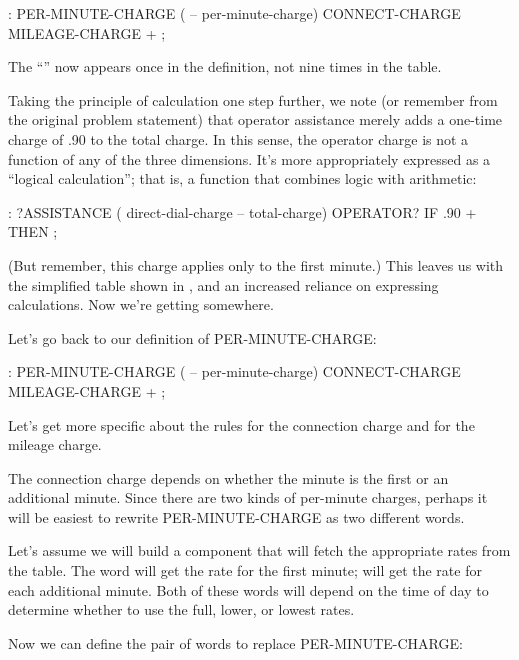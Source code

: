 \begin{Code}
: PER-MINUTE-CHARGE ( -- per-minute-charge)
   CONNECT-CHARGE MILEAGE-CHARGE + ;
\end{Code}

The ``\forth{+}'' now appears once in the definition, not nine times in the table.


\noindent Taking the principle of calculation one step further, we note (or
remember from the original problem statement) that operator assistance
merely adds a one-time charge of .90 to the total charge. In this sense, the
operator charge is not a function of any of the three dimensions. It's more
appropriately expressed as a ``logical calculation''; that is, a function that
combines logic with arithmetic:

\begin{Code}
: ?ASSISTANCE
   ( direct-dial-charge -- total-charge)
   OPERATOR? IF .90 + THEN ;
\end{Code}

(But remember, this charge applies only to the first minute.)
This leaves us with the simplified table shown in , and an
increased reliance on expressing calculations. Now we're getting
somewhere.

Let's go back to our definition of PER-MINUTE-CHARGE:

\begin{Code}
: PER-MINUTE-CHARGE ( -- per-minute-charge)
   CONNECT-CHARGE MILEAGE-CHARGE + ;
\end{Code}

Let's get more specific about the rules for the connection charge and for
the mileage charge.

The connection charge depends on whether the minute is the first or
an additional minute. Since there are two kinds of per-minute charges,
perhaps it will be easiest to rewrite PER-MINUTE-CHARGE as two
different words.

Let's assume we will build a component that will fetch the
appropriate rates from the table. The word  will get the rate for the
first minute;  will get the rate for each additional minute.
Both of these words will depend on the time of day to determine whether
to use the full, lower, or lowest rates.

Now we can define the pair of words to replace PER-MINUTE-CHARGE:


